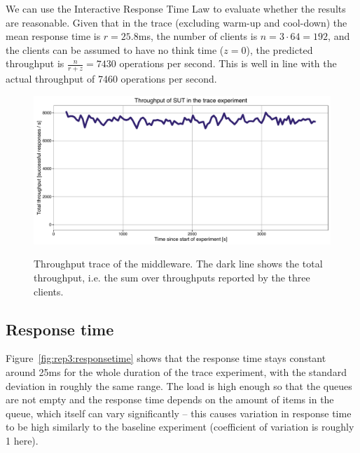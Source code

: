 \documentclass[11pt]{article}
\begin{document}
We can use the Interactive Response Time Law to evaluate whether the results are reasonable. Given that in the trace (excluding warm-up and cool-down) the mean response time is $r=25.8$ms, the number of clients is $n = 3 \cdot 64 = 192$, and the clients can be assumed to have no think time ($z=0$), the predicted throughput is $\frac{n}{r + z} = 7430$ operations per second. This is well in line with the actual throughput of 7460 operations per second.

\begin{figure}[p]
\centering
\includegraphics[width=\textwidth]{../results/trace_rep3/graphs/throughput.pdf}
\label{fig:rep3:throughput}
\caption{Throughput trace of the middleware. The dark line shows the total throughput, i.e. the sum over throughputs reported by the three clients.}
\end{figure}


\subsection{Response time}

Figure~\ref{fig:rep3:responsetime} shows that the response time stays constant around 25ms for the whole duration of the trace experiment, with the standard deviation in roughly the same range. The load is high enough so that the queues are not empty and the response time depends on the amount of items in the queue, which itself can vary significantly -- this causes variation in response time to be high similarly to the baseline experiment (coefficient of variation is roughly 1 here).
\end{document}
